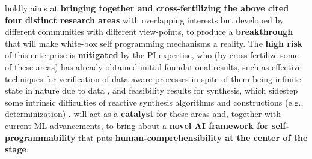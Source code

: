 \project boldly aims at
\textbf{bringing together and cross-fertilizing the above cited four distinct research
  areas} 
with overlapping interests but developed by different communities with different view-points, to
produce a \textbf{breakthrough} that will make white-box self programming mechanisms a reality. 
The \textbf{high risk} of this enterprise is \textbf{mitigated} by the PI expertise, who (by cross-fertilize some of these areas) has already obtained initial foundational results, such as  effective techniques for verification of data-aware processes in spite of them being
infinite state in nature due to data \cite{HaririCGDM13,DeGLP16,CDMP17}, and feasibility results for synthesis, which sidestep some intrinsic
difficulties of reactive synthesis algorithms and constructions (e.g.,
determinization) \cite{DeVa13,DeVa15,DeVa16}.
\project will act as a \textbf{catalyst} for these areas and, together
with current ML advancements, to bring about a \textbf{novel AI framework for self-programmability}
that puts \textbf{human-comprehensibility at the center of the stage}.










